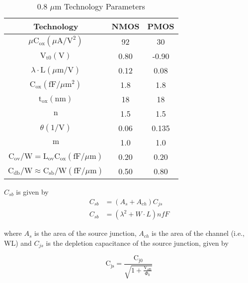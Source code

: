
\begin{table}[H]
    \centering
    \caption{0.8 $\mu \mathrm{m}$ Technology Parameters}
        \begin{tabular}{ccc}
        \hline
        \textbf{Technology} & \textbf{NMOS} & \textbf{PMOS} \\
        \hline
        \( \mu \mathrm{C}_{\mathrm{ox}} \left( \mu \mathrm{A} / \mathrm{V}^2 \right) \) & 92 & 30 \\
        \( \mathrm{V}_{\mathrm{t} 0} (\mathrm{V}) \) & 0.80 & -0.90 \\
        \( \lambda \cdot \mathrm{L} (\mu \mathrm{m} / \mathrm{V}) \) & 0.12 & 0.08 \\
        \( \mathrm{C}_{\mathrm{ox}} \left( \mathrm{fF} / \mu \mathrm{m}^2 \right) \) & 1.8 & 1.8 \\
        \( \mathrm{t}_{\mathrm{ox}} (\mathrm{nm}) \) & 18 & 18 \\
        \( \mathrm{n} \) & 1.5 & 1.5 \\
        \( \theta (1 / \mathrm{V}) \) & 0.06 & 0.135 \\
        \( \mathrm{m} \) & 1.0 & 1.0 \\
        \( \mathrm{C}_{\mathrm{ov}} / \mathrm{W} = \mathrm{L}_{\mathrm{ov}} \mathrm{C}_{\mathrm{ox}} \left( \mathrm{fF} / \mu \mathrm{m} \right) \) & 0.20 & 0.20 \\
        \( \mathrm{C}_{\mathrm{db}} / \mathrm{W} \approx \mathrm{C}_{\mathrm{sb}} / \mathrm{W} \left( \mathrm{fF} / \mu \mathrm{m} \right) \) & 0.50 & 0.80 \\
        \hline
    \end{tabular}
\end{table}

$C_{s b}$ is given by
\begin{align*}
    C_{s b}&=\left(A_{s}+A_{c h}\right) C_{j s}\\
    C_{s b}&=\left(\lambda^2+W\cdot L\right) nfF
\end{align*}


where \( A_{s} \) is the area of the source junction, \( A_{c h} \) is the area of the channel (i.e., WL) and \( C_{j s} \) is the depletion capacitance of the source junction, given by

\[\mathrm{C}_{\mathrm{js}}=\frac{\mathrm{C}_{\mathrm{j} 0}}{\sqrt{1+\frac{\mathrm{V}_{\mathrm{sB}}}{\Phi_{0}}}}\]



